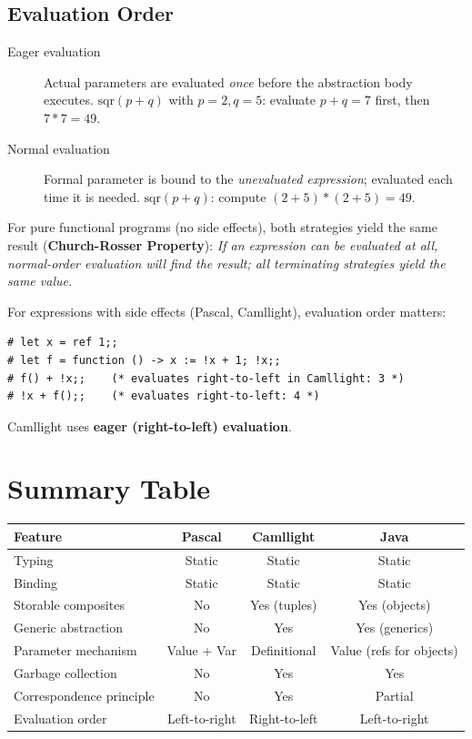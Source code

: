 \documentclass[12pt,a4paper]{article}
\begin{document}
\subsection{Evaluation Order}

\begin{description}
  \item[Eager evaluation] Actual parameters are evaluated \emph{once} before the
        abstraction body executes.
        $\text{sqr}(p+q)$ with $p=2,q=5$: evaluate $p+q=7$ first, then $7*7=49$.
  \item[Normal evaluation] Formal parameter is bound to the \emph{unevaluated expression};
        evaluated each time it is needed.
        $\text{sqr}(p+q)$: compute $(2+5)*(2+5)=49$.
\end{description}

For pure functional programs (no side effects), both strategies yield the same result
(\textbf{Church-Rosser Property}):
\textit{If an expression can be evaluated at all, normal-order evaluation will find the
result; all terminating strategies yield the same value.}

For expressions with side effects (Pascal, Camllight), evaluation order matters:

\begin{lstlisting}[style=caml,numbers=none]
# let x = ref 1;;
# let f = function () -> x := !x + 1; !x;;
# f() + !x;;    (* evaluates right-to-left in Camllight: 3 *)
# !x + f();;    (* evaluates right-to-left: 4 *)
\end{lstlisting}

Camllight uses \textbf{eager (right-to-left) evaluation}.

\section{Summary Table}

\begin{center}
\begin{tabular}{lccc}
\toprule
Feature & Pascal & Camllight & Java\\
\midrule
Typing & Static & Static & Static\\
Binding & Static & Static & Static\\
Storable composites & No & Yes (tuples) & Yes (objects)\\
Generic abstraction & No & Yes & Yes (generics)\\
Parameter mechanism & Value + Var & Definitional & Value (refs for objects)\\
Garbage collection & No & Yes & Yes\\
Correspondence principle & No & Yes & Partial\\
Evaluation order & Left-to-right & Right-to-left & Left-to-right\\
\bottomrule
\end{tabular}
\end{center}
\end{document}
